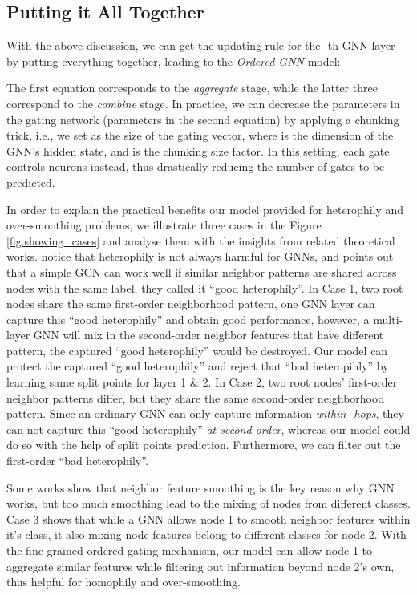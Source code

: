 \documentclass{article}
\begin{document}
\subsection{Putting it All Together}
\label{puttogether}
With the above discussion, we can get the updating rule for the -th GNN layer by putting everything together, leading to the \textit{Ordered GNN} model:



The first equation corresponds to the \textit{aggregate} stage, while the latter three correspond to the \textit{combine} stage. In practice, we can decrease the parameters in the gating network (parameters in the second equation) by applying a chunking trick, i.e., we set  as the size of the gating vector, where  is the dimension of the GNN's hidden state, and  is the chunking size factor. In this setting, each gate controls  neurons instead, thus drastically reducing the number of gates to be predicted.


In order to explain the practical benefits our model provided for heterophily and over-smoothing problems, we illustrate three cases in the Figure \ref{fig.showing_cases} and analyse them with the insights from related theoretical works. \citet{luan2021heterophily,ma2021homophily} notice that heterophily is not always harmful for GNNs, and \citet{ma2021homophily} points out that a simple GCN can work well if similar neighbor patterns are shared across nodes with the same label, they called it ``good heterophily''.
In Case 1, two root nodes share the same first-order neighborhood pattern, one GNN layer can capture this ``good heterophily'' and obtain good performance, however, a multi-layer GNN will mix in the second-order neighbor features that have different pattern, the captured ``good heterophily'' would be destroyed. Our model can protect the captured ``good heterophily'' and reject that ``bad heteropihly'' by learning same split points for layer 1 \& 2.
In Case 2, two root nodes' first-order neighbor patterns differ, but they share the same second-order neighborhood pattern. Since an ordinary GNN can only capture information \textit{within -hops}, they can not capture this ``good heterophily'' \textit{at second-order}, whereas our model could do so with the help of split points prediction. Furthermore, we can filter out the first-order ``bad heterophily''.

Some works \citep{li2018deeper,chen2020measuring,ma2021homophily} show that neighbor feature smoothing is the key reason why GNN works, but too much smoothing lead to the mixing of nodes from different classes. Case 3 shows that while a GNN allows node 1 to smooth neighbor features within it's class, it also mixing node features belong to different classes for node 2. With the fine-grained ordered gating mechanism, our model can allow node 1 to aggregate similar features while filtering out information beyond node 2's own, thus helpful for homophily and over-smoothing.
\end{document}
